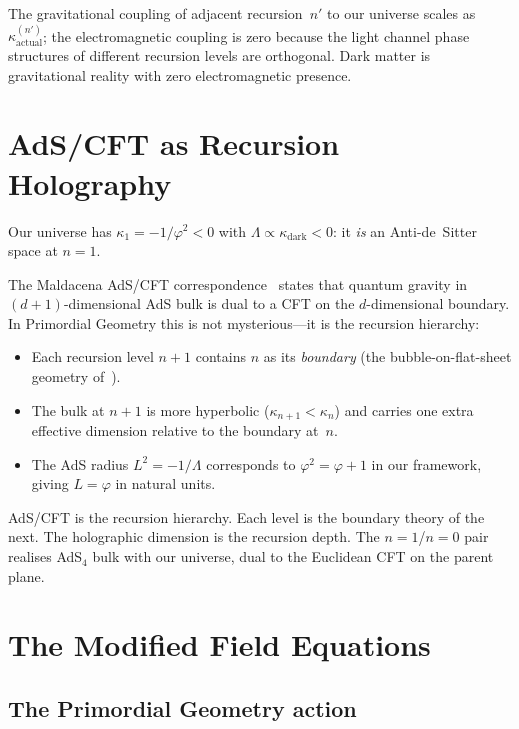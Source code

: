 \documentclass[prd,twocolumn,preprintnumbers,amsmath,amssymb]{revtex4-2}
\newcommand{\phig}{\varphi}
\newcommand{\kact}{\kappa_{\mathrm{actual}}}
\newcommand{\kdark}{\kappa_{\mathrm{dark}}}
\begin{document}
The gravitational coupling of adjacent recursion~$n'$ to our universe scales
as $\kact^{(n')}$; the electromagnetic coupling is zero because the light
channel phase structures of different recursion levels are orthogonal.
Dark matter is gravitational reality with zero electromagnetic presence.

\section{AdS/CFT as Recursion Holography}
\label{sec:adscft}

Our universe has $\kappa_1 = -1/\phig^2 < 0$ with $\Lambda \propto \kdark <
0$: it \emph{is} an Anti-de~Sitter space at $n=1$.

The Maldacena AdS/CFT correspondence~\cite{Maldacena1997} states that quantum
gravity in $(d+1)$-dimensional AdS bulk is dual to a CFT on the $d$-dimensional
boundary.  In Primordial Geometry this is not mysterious---it is the recursion
hierarchy:

\begin{itemize}
  \item Each recursion level $n+1$ contains $n$ as its \emph{boundary}
        (the bubble-on-flat-sheet geometry of~\cite{Shields2026um}).
  \item The bulk at $n+1$ is more hyperbolic ($\kappa_{n+1} < \kappa_n$) and
        carries one extra effective dimension relative to the boundary at~$n$.
  \item The AdS radius $L^2 = -1/\Lambda$ corresponds to $\phig^2 = \phig+1$
        in our framework, giving $L = \phig$ in natural units.
\end{itemize}

AdS/CFT is the recursion hierarchy.  Each level is the boundary theory of the
next.  The holographic dimension is the recursion depth.  The $n=1$/$n=0$ pair
realises AdS$_4$ bulk with our universe, dual to the Euclidean CFT on the
parent plane.

\section{The Modified Field Equations}
\label{sec:field}

\subsection{The Primordial Geometry action}
\end{document}
